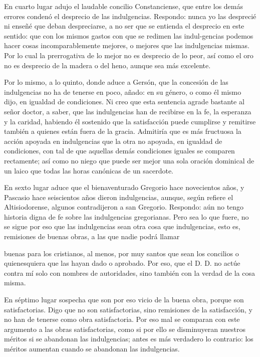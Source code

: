 En cuarto lugar adujo el laudable concilio Constanciense, que entre los demás errores condenó el desprecio de las indulgencias. Respondo: nunca yo las desprecié ni enseñé que deban despreciarse, a no ser que se entienda el desprecio en este sentido: que con los mismos gastos con que se redimen las indul-\marginpar{\small[348]}gencias podemos hacer cosas incomparablemente mejores, o mejores que las indulgencias mismas. Por lo cual la prerrogativa de lo mejor no es desprecio de lo peor, así como el oro no es desprecio de la madera o del heno, aunque sea más excelente.

Por lo mismo, a lo quinto, donde aduce a Gersón, que la concesión de las indulgencias no ha de tenerse en poco, añado: en su género, o como él mismo dijo, en igualdad de condiciones. Ni creo que esta sentencia agrade bastante al señor doctor, a saber, que las indulgencias han de recibirse en la fe, la esperanza y la caridad, habiendo él sostenido que la satisfacción puede cumplirse y remitirse también a quienes están fuera de la gracia. Admitiría que es más fructuosa la acción apoyada en indulgencias que la otra no apoyada, en igualdad de condiciones, con tal de que aquellas demás condiciones iguales se comparen rectamente; así como no niego que puede ser mejor una sola oración dominical de un laico que todas las horas canónicas de un sacerdote.

En sexto lugar aduce que el bienaventurado Gregorio hace novecientos años, y Pascasio hace seiscientos años dieron indulgencias, aunque, según refiere el Altisiodorense, algunos contradijeron a san Gregorio. Respondo: aún no tengo historia digna de fe sobre las indulgencias gregorianas. Pero sea lo que fuere, no se sigue por eso que las indulgencias sean otra cosa que indulgencias, esto es, remisiones de buenas obras, a las que nadie podrá llamar

buenas para los cristianos, al menos, por muy santos que sean los concilios o quienesquiera que las hayan dado o aprobado. Por eso, que el D. D. no actúe contra mí solo con nombres de autoridades, sino también con la verdad de la cosa misma.

En séptimo lugar sospecha que son por eso vicio de la buena obra, porque son satisfactorias. Digo que no son satisfactorias, sino remisiones de la satisfacción, y no han de tenerse como obra satisfactoria. Por eso mal se comparan con este argumento a las obras satisfactorias, como si por ello se disminuyeran nuestros méritos si se abandonan las indulgencias; antes es más verdadero lo contrario: los méritos aumentan cuando se abandonan las indulgencias.


